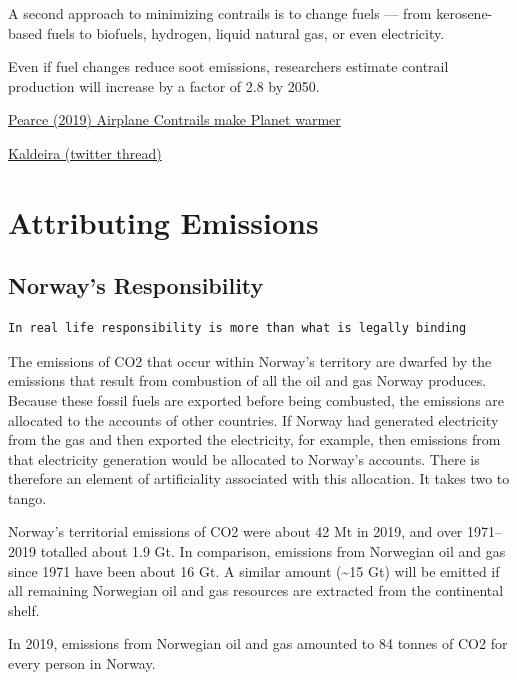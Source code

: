 \documentclass[
]{book}
\begin{document}
A second approach to minimizing contrails is to change fuels --- from kerosene-based fuels to biofuels, hydrogen, liquid natural gas, or even electricity.

Even if fuel changes reduce soot emissions, researchers estimate contrail production will increase by a factor of 2.8 by 2050.

\href{https://e360.yale.edu/features/how-airplane-contrails-are-helping-make-the-planet-warmer}{Pearce (2019) Airplane Contrails make Planet warmer}

\href{https://twitter.com/KenCaldeira/status/1394648353594515460/photo/1}{Kaldeira (twitter thread)}

\hypertarget{attributing-emissions}{%
\section{Attributing Emissions}\label{attributing-emissions}}

\hypertarget{norways-responsibility}{%
\subsection{Norway's Responsibility}\label{norways-responsibility}}

\begin{verbatim}
In real life responsibility is more than what is legally binding
\end{verbatim}

The emissions of CO2 that occur within Norway's territory are dwarfed by the emissions that result from combustion of all the oil and gas Norway produces. Because these fossil fuels are exported before being combusted, the emissions are allocated to the accounts of other countries. If Norway had generated electricity from the gas and then exported the electricity, for example, then emissions from that electricity generation would be allocated to Norway's accounts. There is therefore an element of artificiality associated with this allocation. It takes two to tango.

Norway's territorial emissions of CO2 were about 42 Mt in 2019, and over 1971--2019 totalled about 1.9 Gt. In comparison, emissions from Norwegian oil and gas since 1971 have been about 16 Gt. A similar amount (\textasciitilde15 Gt) will be emitted if all remaining Norwegian oil and gas resources are extracted from the continental shelf.

In 2019, emissions from Norwegian oil and gas amounted to 84 tonnes of CO2 for every person in Norway.
\end{document}

